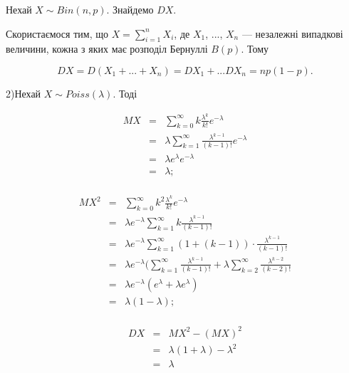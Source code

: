 \begin{example}
    Нехай $X \sim Bin(n, p)$. Знайдемо $DX$.
    
    Скористаємося тим, що $X = \sum\limits_{i=1}^{n} X_i$,
    де $X_1$, ..., $X_n$ --- незалежні випадкові
    величини, кожна з яких має
    розподіл Бернуллі $B(p)$. Тому
    
    $$DX
    = D(X_1 + ... + X_n)
    = DX_1 + ... DX_n
    = n p (1-p).$$
\end{example}

\begin{example}
\end{example}
2)Нехай $X \sim Poiss(\lambda)$. Тоді

$$\begin{array}{rcl}
    MX & = & \sum\limits_{k=0}^{\infty} k \frac{\lambda^k}{k!} e^{-\lambda} \\
    & = & \lambda \sum\limits_{k=1}^{\infty} \frac{\lambda^{k-1}}{(k-1)!} e^{-\lambda} \\
    & = & \lambda e^{\lambda} e^{-\lambda} \\
    & = & \lambda; \\
\end{array}$$

$$\begin{array}{rcl}
    MX^2 & = & \sum\limits_{k=0}^{\infty} k^2 \frac{\lambda^k}{k!} e^{-\lambda} \\
    & = & \lambda e^{-\lambda} \sum\limits_{k=1}^{\infty} k \frac{\lambda^{k-1}}{(k-1)!} \\
    & = & \lambda e^{-\lambda} \sum\limits_{k=1}^{\infty} (1 + (k-1))\cdot \frac{\lambda^{k-1}}{(k-1)!} \\
    & = & \lambda e^{-\lambda} 
        (\sum\limits_{k=1}^{\infty} \frac{\lambda^{k-1}}{(k-1)!}
        + \lambda \sum\limits_{k=2}^{\infty} \frac{\lambda^{k-2}}{(k-2)!} \\
    & = & \lambda e^{-\lambda} (e^{\lambda} + \lambda e^{\lambda}) \\
    & = & \lambda (1 - \lambda); \\
\end{array}$$

$$\begin{array}{rcl}
    DX & = & MX^2 - (MX)^2 \\
    & = & \lambda(1 + \lambda) - \lambda^2 \\
    & = & \lambda \\
\end{array}$$


